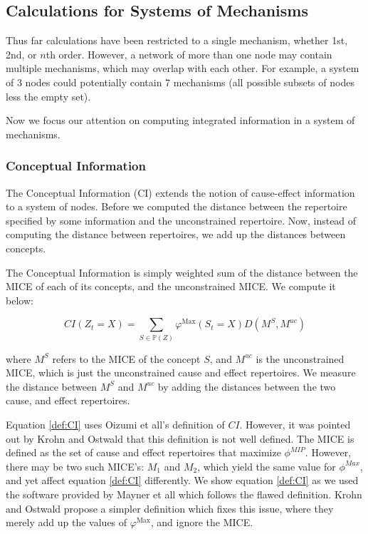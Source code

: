 \subsection{Calculations for Systems of Mechanisms}
Thus far calculations have been restricted to a single mechanism, whether 1st, 2nd, or $n$th order. However, a network of more than one node may contain multiple mechanisms, which may overlap with each other. For example, a system of 3 nodes could potentially contain 7 mechanisms (all possible subsets of nodes less the empty set).

Now we focus our attention on computing integrated information in a system of mechanisms. 

\subsubsection{Conceptual Information}
\label{sec:CI}
The Conceptual Information (CI) extends the notion of cause-effect information to a system of nodes. Before we computed the distance between the repertoire specified by some information and the unconstrained repertoire. Now, instead of computing the distance between repertoires, we add up the distances between concepts.

The Conceptual Information is simply weighted sum of the distance between the MICE of each of its concepts, and the unconstrained MICE. We compute it below:

\begin{equation}
\label{def:CI}
CI(Z_t = X) = \sum \limits_{S \in \mathbb{P}(Z)} \varphi^{\text{Max}}(S_t=X) D(M^S, M^{uc})
\end{equation}

where $M^S$ refers to the MICE of the concept $S$, and $M^{uc}$ is the unconstrained MICE, which is just the unconstrained cause and effect repertoires. We measure the distance between $M^S$ and $M^{uc}$ by adding the distances between the two cause, and effect repertoires.

\begin{remark}
	Equation \ref{def:CI} uses Oizumi et all's \cite{oizumi2014phenomenology} definition of $CI$. However, it was pointed out by Krohn and Ostwald \cite{krohn2016computing} that this definition is not well defined. The MICE is defined as the set of cause and effect repertoires that maximize $\phi^{MIP}$. However, there may be two such MICE's: $M_1$ and $M_2$, which yield the same value for $\phi^{Max}$, and yet affect equation \ref{def:CI} differently. We show equation \ref{def:CI} as we used the software provided by Mayner et all \cite{pyphi} which follows the flawed definition. Krohn and Ostwald propose a simpler definition which fixes this issue, where they merely add up the values of $\varphi^{\text{Max}}$, and ignore the MICE.
\end{remark}

